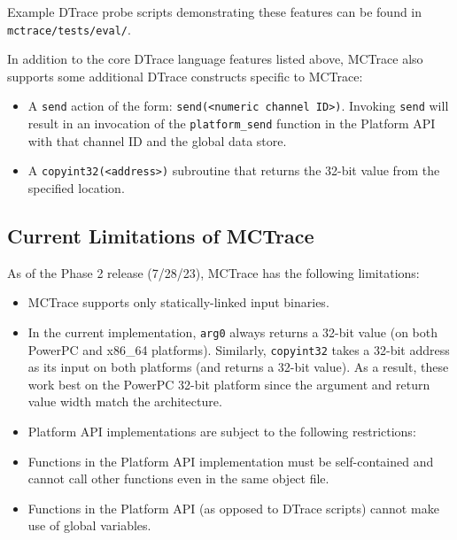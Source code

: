 Example DTrace probe scripts demonstrating these features can be
found in \texttt{mctrace/tests/eval/}.

In addition to the core DTrace language features listed above,
   MCTrace also supports some additional DTrace constructs specific to
   MCTrace:
   \begin{itemize}
   \item  A \texttt{send} action of the form: \texttt{send(<numeric channel ID>)}. Invoking
     \texttt{send} will result in an invocation of the \texttt{platform\_send} function
     in the Platform API with that channel ID and the global data store.
   \item A \texttt{copyint32(<address>)} subroutine that returns the 32-bit value
     from the specified location.
   \end{itemize}
   
\subsection{Current Limitations of MCTrace}
\label{sec:curr-limit-mctr}

As of the Phase 2 release (7/28/23), MCTrace has the following limitations:
\begin{itemize}
\item MCTrace supports only statically-linked input binaries.
\item In the current implementation, \texttt{arg0} always returns a 32-bit value
   (on both PowerPC and x86\_64 platforms). Similarly, \texttt{copyint32}
   takes a 32-bit address as its input on both platforms (and returns
   a 32-bit value). As a result, these work best on the PowerPC 32-bit
   platform since the argument and return value width match the
   architecture.
 \item Platform API implementations are subject to the following
   restrictions:
 \item Functions in the Platform API implementation must be self-contained
     and cannot call other functions even in the same object file.
   \item Functions in the Platform API (as opposed to DTrace scripts)
     cannot make use of global variables. 
   \end{itemize}
   
